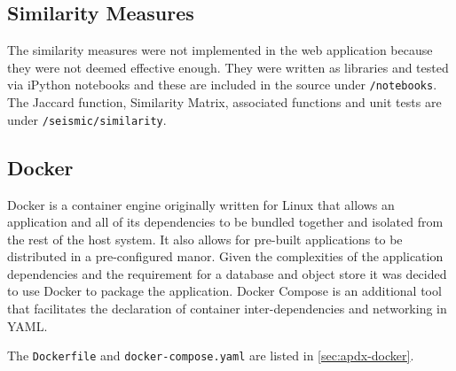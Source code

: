 \documentclass[../report.tex]{subfiles}
\begin{document}
\subsection{Similarity Measures}

	The similarity measures were not implemented in the web application because they were not deemed effective enough.  They were written as libraries and tested via iPython notebooks \citep{ipython} and these are included in the source under \texttt{/notebooks}.  The Jaccard function, Similarity Matrix, associated functions and unit tests are under \texttt{/seismic/similarity}.
	
\subsection{Docker}

	Docker is a container engine originally written for Linux that allows an application and all of its dependencies to be bundled together and isolated from the rest of the host system.  It also allows for pre-built applications to be distributed in a pre-configured manor.  Given the complexities of the application dependencies and the requirement for a database and object store it was decided to use Docker to package the application.  Docker Compose is an additional tool that facilitates the declaration of container inter-dependencies and networking in YAML.
	
	The \texttt{Dockerfile} and \texttt{docker-compose.yaml} are listed in \cref{sec:apdx-docker}.

	
\end{document}
